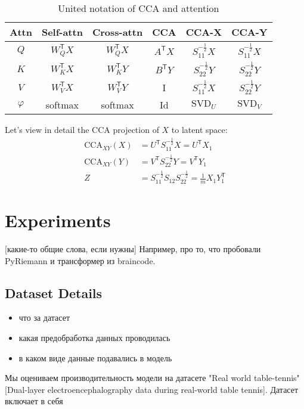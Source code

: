 \documentclass[a4paper,14pt]{article}
\newcommand{\T}{^{\mathsf{T}}}
\theoremstyle{plain} %
\theoremstyle{definition} %
\theoremstyle{remark} %
\begin{document}
	\begin{table}[bhtp]
		\centering
		\begin{tabulary}{\textwidth}{|C|C|C|C|C|C|}
			\hline
			\textbf{Attn} & \textbf{Self-attn} & \textbf{Cross-attn} & \textbf{CCA} & \textbf{CCA-X} & \textbf{CCA-Y} \\
			\hline
			$Q$                & $W_Q\T X$                 & $W_Q\T X$                  & $A\T X$ & $S_{11}^{-\frac{1}{2}}X$ & $S_{11}^{-\frac{1}{2}}X$  \\
			\hline
			$K$                & $W_K\T X$                 & $W_K\T Y$                  & $B\T Y$ & $S_{22}^{-\frac{1}{2}}Y$ & $S_{22}^{-\frac{1}{2}}Y$    \\
			\hline
			$V$                & $W_V\T X$                 & $W_V\T Y$                  & I & $S_{11}^{-\frac{1}{2}}X$ & $S_{22}^{-\frac{1}{2}}Y$  \\
			\hline 
			$\varphi$ & softmax & softmax & Id & $\text{SVD}_U$ & $\text{SVD}_V$ \\
			\hline  
		\end{tabulary}
		\caption{United notation of CCA and attention}
	\end{table}

	Let's view in detail the CCA projection of $X$ to latent space:
	\begin{equation}
		\begin{aligned}
			\text{CCA}_{XY}(X) &= U\T S_{11}^{-\frac{1}{2}}X = U\T X_1 \\
			\text{CCA}_{XY}(Y) &= V\T S_{22}^{-\frac{1}{2}}Y = V\T Y_1 \\
			Z &= S_{11}^{- \frac{1}{2}} S_{12} S_{22}^{- \frac{1}{2}} = \frac{1}{m} X_1 Y_1\T
		\end{aligned}
	\end{equation}
        

        \section{Experiments}
        [какие-то общие слова, если нужны] Например, про то, что пробовали PyRiemann и трансформер из braincode.
        \subsection{Dataset Details}
        \begin{itemize}
            \item что за датасет
            \item какая предобработка данных проводилась
            \item в каком виде данные подавались в модель
        \end{itemize}
        Мы оцениваем производительность модели на датасете "Real world table-tennis" [Dual-layer electroencephalography data during real-world table tennis]. Датасет включает в себя 
        
\end{document}
